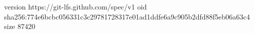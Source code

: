 version https://git-lfs.github.com/spec/v1
oid sha256:774e6bcbc056331c3c29781728317e01ad1ddfe6a9c905b2dfd88f5eb06a63c4
size 87420
